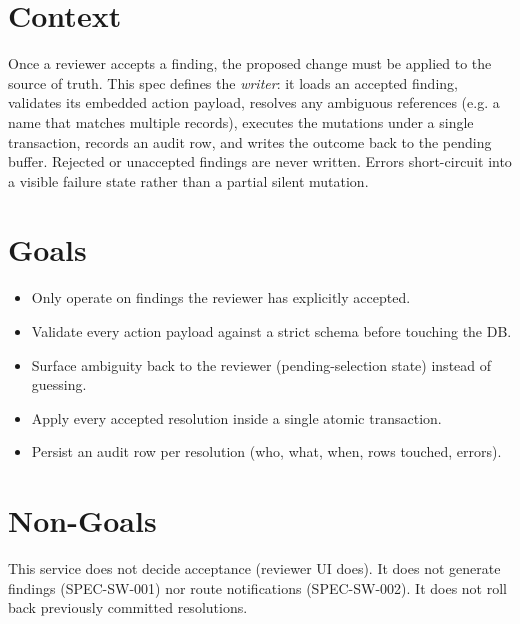 



\makespecheader

\section{Context}
Once a reviewer accepts a finding, the proposed change must be applied to the source of truth. This spec defines the \emph{writer}: it loads an accepted finding, validates its embedded action payload, resolves any ambiguous references (e.g. a name that matches multiple records), executes the mutations under a single transaction, records an audit row, and writes the outcome back to the pending buffer. Rejected or unaccepted findings are never written. Errors short-circuit into a visible failure state rather than a partial silent mutation.

\section{Goals}
\begin{itemize}[leftmargin=1.2em]
  \item Only operate on findings the reviewer has explicitly accepted.
  \item Validate every action payload against a strict schema before touching the DB.
  \item Surface ambiguity back to the reviewer (pending-selection state) instead of guessing.
  \item Apply every accepted resolution inside a single atomic transaction.
  \item Persist an audit row per resolution (who, what, when, rows touched, errors).
\end{itemize}

\section{Non-Goals}
\begin{nongoal}
This service does not decide acceptance (reviewer UI does). It does not generate findings (SPEC-SW-001) nor route notifications (SPEC-SW-002). It does not roll back previously committed resolutions.
\end{nongoal}

